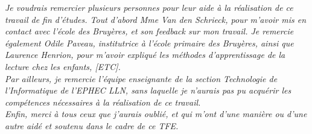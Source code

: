 \begin{center}
\begin{minipage}{0.8\textwidth}
\textit{Je voudrais remercier plusieurs personnes pour leur aide à la réalisation de ce travail de fin d'études. Tout d'abord Mme Van den Schrieck, pour m'avoir mis en contact avec l'école des Bruyères, et son feedback sur mon travail. Je remercie également Odile Paveau, institutrice à l'école primaire des Bruyères, ainsi que Laurence Henrion, pour m'avoir expliqué les méthodes d'apprentissage de la lecture chez les enfants, [ETC].\\
Par ailleurs, je remercie l'équipe enseignante de la section Technologie de l'Informatique de l'EPHEC LLN, sans laquelle je n'aurais pas pu acquérir les compétences nécessaires à la réalisation de ce travail.\\
Enfin, merci à tous ceux que j'aurais oublié, et qui m'ont d'une manière ou d'une autre aidé et soutenu dans le cadre de ce TFE. }
\end{minipage}
\end{center}
